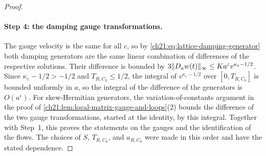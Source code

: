 \begin{proof}
\paragraph{Step 4: the damping gauge transformations.}
The gauge velocity is the same for all $c$, so by \eqref{ch21:eq:lattice-damping-generator} both damping generators are the same linear combination of differences of the respective solutions. Their difference is bounded by $3\lVert D_aw(t)\rVert_\infty\le Ka^\varepsilon v^{\kappa_\varepsilon-1/2}$. Since $\kappa_\varepsilon-1/2>-1/2$ and $T_{R,C_0}\le1/2$, the integral of $v^{\kappa_\varepsilon-1/2}$ over $[0,T_{R,C_0}]$ is bounded uniformly in $a$, so the integral of the difference of the generators is $O(a^\varepsilon)$. For skew-Hermitian generators, the variation-of-constants argument in the proof of \cref{ch21:lem:local-matrix-gauge-and-loops}(2) bounds the difference of the two gauge transformations, started at the identity, by this integral. Together with Step~1, this proves the statements on the gauges and the identification of the flows. The choices of $S$, $T_{R,C_0}$, and $a_{R,C_0}$ were made in this order and have the stated dependence.
\end{proof}
